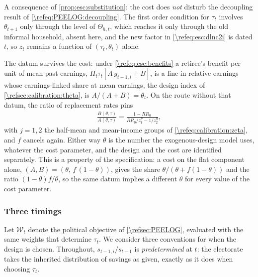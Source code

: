 A consequence of \cref{prop:esc:substitution}: the cost does \emph{not} disturb the decoupling result of \eqref{\refeq:PEELOG:decoupling}. The first order condition for $\tau_t$ involves $\theta_{t+1}$ only through the level of $\Theta_{h,t}$, which reaches it only through the old informal household, absent here, and the new factor in \eqref{\refeq:esc:dlnc2i} is dated $t$, so $z_t$ remains a function of $\left(\tau_t,\theta_t\right)$ alone.


The datum survives the cost: under \eqref{\refeq:esc:benefits} a retiree's benefit per unit of mean past earnings, $\Pi_t\tau_t\left[A\,y_{t-1,i}+B\right]$, is a line in relative earnings whose earnings-linked share at mean earnings, the design index of \cref{\refsec:calibration:theta}, is $A/(A+B) = \theta_t$. On the route without that datum, the ratio of replacement rates pins
\begin{align}\label{\refeq:esc:RR}
    \frac{B(\theta,\tau)}{A(\theta,\tau)} = \frac{1-RR_0}{RR_0/z_1^{\eta} - 1/z_2^{\eta}},
\end{align}
with $j=1,2$ the half-mean and mean-income groups of \eqref{\refeq:calibration:zeta}, and $f$ cancels again. Either way $\theta$ is the number the exogenous-design model uses, whatever the cost parameter, and the design and the cost are identified separately. This is a property of the specification: a cost on the flat component alone, $(A,B) = (\theta,\, f\,(1-\theta))$, gives the share $\theta/(\theta+f(1-\theta))$ and the ratio $(1-\theta)f/\theta$, so the same datum implies a different $\theta$ for every value of the cost parameter.


\subsubsection{Three timings}\label{\refsec:ESC:timing}
Let $\mathcal{W}_t$ denote the political objective of \cref{\refsec:PEELOG}, evaluated with the same weights that determine $\tau_t$. We consider three conventions for when the design is chosen. Throughout, $s_{t-1,i}/s_{t-1}$ is \emph{predetermined} at $t$: the electorate takes the inherited distribution of savings as given, exactly as it does when choosing $\tau_t$.

